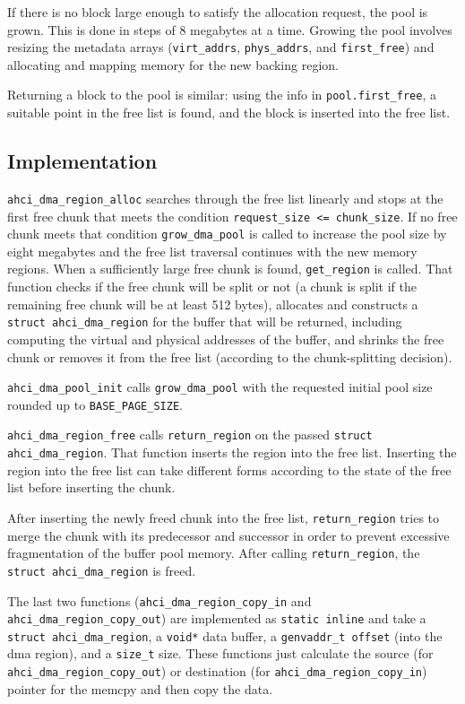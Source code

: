 If there is no block large enough to satisfy the allocation request, the pool
is grown. This is done in steps of 8 megabytes at a time. Growing the pool
involves resizing the metadata arrays (\lstinline+virt_addrs+,
\lstinline+phys_addrs+, and \lstinline+first_free+) and allocating and mapping
memory for the new backing region.

Returning a block to the pool is similar: using the info in
\lstinline+pool.first_free+, a suitable point in the free list is found, and
the block is inserted into the free list. 

\subsection{Implementation}

\lstinline+ahci_dma_region_alloc+ searches through the free list linearly and
stops at the first free chunk that meets the condition {\tt request\_size <=
chunk\_size}. If no free chunk meets that condition \lstinline+grow_dma_pool+
is called to increase the pool size by eight megabytes and the free list
traversal continues with the new memory regions.  When a sufficiently large
free chunk is found, \lstinline+get_region+ is called.  That function checks if
the free chunk will be split or not (a chunk is split if the remaining free
chunk will be at least 512 bytes), allocates and constructs a
\lstinline+struct ahci_dma_region+ for the buffer that will be returned,
including computing the virtual and physical addresses of the buffer, and
shrinks the free chunk or removes it from the free list (according to the
chunk-splitting decision).

\lstinline+ahci_dma_pool_init+ calls \lstinline+grow_dma_pool+ with the
requested initial pool size rounded up to \lstinline+BASE_PAGE_SIZE+.

\lstinline+ahci_dma_region_free+ calls \lstinline+return_region+ on the passed
\lstinline+struct ahci_dma_region+. That function inserts the region into the
free list. Inserting the region into the free list can take different forms
according to the state of the free list before inserting the chunk.

After inserting the newly freed chunk into the free list,
\lstinline+return_region+ tries to merge the chunk with its predecessor and
successor in order to prevent excessive fragmentation of the buffer pool
memory.  After calling \lstinline+return_region+, the
\lstinline+struct ahci_dma_region+ is freed.

The last two functions (\lstinline+ahci_dma_region_copy_in+ and
\lstinline+ahci_dma_region_copy_out+) are implemented as
\lstinline+static inline+ and take a \lstinline+struct ahci_dma_region+, a
\lstinline+void*+ data
buffer, a \lstinline+genvaddr_t offset+ (into the \acs{dma} region), and a
\lstinline+size_t+ size. These functions just calculate the source (for
\lstinline+ahci_dma_region_copy_out+) or destination (for
\lstinline+ahci_dma_region_copy_in+) pointer for the memcpy and then copy the
data.

